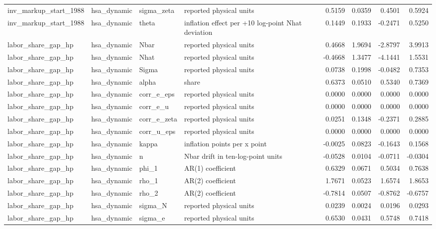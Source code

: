\begin{tabular}{llllrrrr}
inv\_markup\_start\_1988 & hsa\_dynamic & sigma\_zeta & reported physical units & 0.5159 & 0.0359 & 0.4501 & 0.5924 \\
inv\_markup\_start\_1988 & hsa\_dynamic & theta & inflation effect per +10 log-point Nhat deviation & 0.1449 & 0.1933 & -0.2471 & 0.5250 \\
labor\_share\_gap\_hp & hsa\_dynamic & Nbar & reported physical units & 0.4668 & 1.9694 & -2.8797 & 3.9913 \\
labor\_share\_gap\_hp & hsa\_dynamic & Nhat & reported physical units & -0.4668 & 1.3477 & -4.1441 & 1.5531 \\
labor\_share\_gap\_hp & hsa\_dynamic & Sigma & reported physical units & 0.0738 & 0.1998 & -0.0482 & 0.7353 \\
labor\_share\_gap\_hp & hsa\_dynamic & alpha & share & 0.6373 & 0.0510 & 0.5340 & 0.7369 \\
labor\_share\_gap\_hp & hsa\_dynamic & corr\_e\_eps & reported physical units & 0.0000 & 0.0000 & 0.0000 & 0.0000 \\
labor\_share\_gap\_hp & hsa\_dynamic & corr\_e\_u & reported physical units & 0.0000 & 0.0000 & 0.0000 & 0.0000 \\
labor\_share\_gap\_hp & hsa\_dynamic & corr\_e\_zeta & reported physical units & 0.0251 & 0.1348 & -0.2371 & 0.2885 \\
labor\_share\_gap\_hp & hsa\_dynamic & corr\_u\_eps & reported physical units & 0.0000 & 0.0000 & 0.0000 & 0.0000 \\
labor\_share\_gap\_hp & hsa\_dynamic & kappa & inflation points per x point & -0.0025 & 0.0823 & -0.1643 & 0.1568 \\
labor\_share\_gap\_hp & hsa\_dynamic & n & Nbar drift in ten-log-point units & -0.0528 & 0.0104 & -0.0711 & -0.0304 \\
labor\_share\_gap\_hp & hsa\_dynamic & phi\_1 & AR(1) coefficient & 0.6329 & 0.0671 & 0.5034 & 0.7638 \\
labor\_share\_gap\_hp & hsa\_dynamic & rho\_1 & AR(2) coefficient & 1.7671 & 0.0523 & 1.6574 & 1.8653 \\
labor\_share\_gap\_hp & hsa\_dynamic & rho\_2 & AR(2) coefficient & -0.7814 & 0.0507 & -0.8762 & -0.6757 \\
labor\_share\_gap\_hp & hsa\_dynamic & sigma\_N & reported physical units & 0.0239 & 0.0024 & 0.0196 & 0.0293 \\
labor\_share\_gap\_hp & hsa\_dynamic & sigma\_e & reported physical units & 0.6530 & 0.0431 & 0.5748 & 0.7418 \\

\end{tabular}
